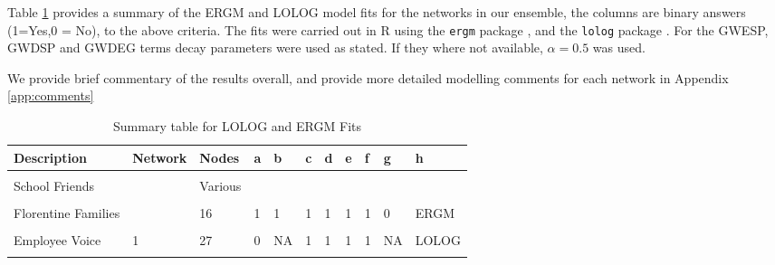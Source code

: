 \documentclass[
]{statsoc}
\begin{document}
Table \ref{tab:summary_table} provides a summary of the ERGM and LOLOG
model fits for the networks in our ensemble, the columns are binary
answers (1=Yes,0 = No), to the above criteria. The fits were carried out
in R using the \texttt{ergm} package \citep{ergm_3_9_4}, and the
\texttt{lolog} package \citep{LOLOG_github}. For the GWESP, GWDSP and
GWDEG terms decay parameters were used as stated. If they where not
available, \(\alpha= 0.5\) was used.

We provide brief commentary of the results overall, and provide more
detailed modelling comments for each network in Appendix
\ref{app:comments}

\begin{longtable}[t]{lllllllllll}
\caption{\label{tab:unnamed-chunk-8}\label{tab:summary_table} Summary table for LOLOG and ERGM Fits}\\
\toprule
Description & Network & Nodes & a & b & c & d & e & f & g & h\\
\midrule
\cellcolor{gray!6}{Add Health} & \cellcolor{gray!6}{} & \cellcolor{gray!6}{1618} & \cellcolor{gray!6}{1} & \cellcolor{gray!6}{0} & \cellcolor{gray!6}{1} & \cellcolor{gray!6}{0} & \cellcolor{gray!6}{1} & \cellcolor{gray!6}{1} & \cellcolor{gray!6}{1} & \cellcolor{gray!6}{LOLOG}\\
School Friends &  & Various &  &  &  &  &  &  &  & \\
\cellcolor{gray!6}{Kapferer's Tailors} & \cellcolor{gray!6}{} & \cellcolor{gray!6}{39} & \cellcolor{gray!6}{1} & \cellcolor{gray!6}{0} & \cellcolor{gray!6}{1} & \cellcolor{gray!6}{0} & \cellcolor{gray!6}{1} & \cellcolor{gray!6}{1} & \cellcolor{gray!6}{0} & \cellcolor{gray!6}{LOLOG}\\
Florentine Families &  & 16 & 1 & 1 & 1 & 1 & 1 & 1 & 0 & ERGM\\
\cellcolor{gray!6}{German Schoolboys} & \cellcolor{gray!6}{} & \cellcolor{gray!6}{53} & \cellcolor{gray!6}{1} & \cellcolor{gray!6}{1} & \cellcolor{gray!6}{0} & \cellcolor{gray!6}{NA} & \cellcolor{gray!6}{1} & \cellcolor{gray!6}{1} & \cellcolor{gray!6}{1} & \cellcolor{gray!6}{Both}\\
\addlinespace
Employee Voice & 1 & 27 & 0 & NA & 1 & 1 & 1 & 1 & NA & LOLOG\\
\cellcolor{gray!6}{Employee Voice} & \cellcolor{gray!6}{2} & \cellcolor{gray!6}{24} & \cellcolor{gray!6}{1} & \cellcolor{gray!6}{1} & \cellcolor{gray!6}{0} & \cellcolor{gray!6}{NA} & \cellcolor{gray!6}{0} & \cellcolor{gray!6}{0} & \cellcolor{gray!6}{NA} & \cellcolor{gray!6}{ERGM}\\

\end{longtable}
\end{document}
